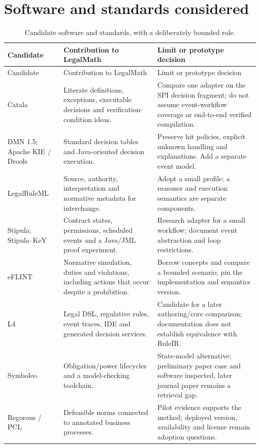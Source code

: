 \section{Software and standards considered}
\begingroup\small
\begin{longtable}{P{0.19\textwidth}P{0.37\textwidth}P{0.34\textwidth}}
\caption{Candidate software and standards, with a deliberately bounded role.}
\label{tab:software-detail}\\
\toprule Candidate & Contribution to LegalMath & Limit or prototype decision \\\midrule
\endfirsthead
\toprule Candidate & Contribution to LegalMath & Limit or prototype decision \\\midrule
\endhead
Catala & Literate definitions, exceptions, executable decisions and verification-condition ideas. & Compare one adapter on the SPI decision fragment; do not assume event-workflow coverage or end-to-end verified compilation. \citep{catalacode}\\
DMN 1.5; Apache KIE / Drools & Standard decision tables and Java-oriented decision execution. & Preserve hit policies, explicit unknown handling and explanations. Add a separate event model. \citep{dmn2024,droolscode}\\
LegalRuleML & Source, authority, interpretation and normative metadata for interchange. & Adopt a small profile; a reasoner and execution semantics are separate components. \citep{legalruleml2021}\\
Stipula; Stipula--KeY & Contract states, permissions, scheduled events and a Java/JML proof experiment. & Research adapter for a small workflow; document event abstraction and loop restrictions. \citep{stipulacode,stipulakeycode}\\
eFLINT & Normative simulation, duties and violations, including actions that occur despite a prohibition. & Borrow concepts and compare a bounded scenario; pin the implementation and semantics version. \citep{eflint2026}\\
L4 & Legal DSL, regulative rules, event traces, IDE and generated decision services. & Candidate for a later authoring/core comparison; documentation does not establish equivalence with RuleIR. \citep{l4code}\\
Symboleo & Obligation/power lifecycles and a model-checking toolchain. & State-model alternative; preliminary paper case and software inspected, later journal paper remains a retrieval gap. \citep{symboleo2020,symboleocode}\\
Regorous / PCL & Defeasible norms connected to annotated business processes. & Pilot evidence supports the method; deployed version, availability and license remain adoption questions. \citep{semanticcompliance2016}\\

\end{longtable}
